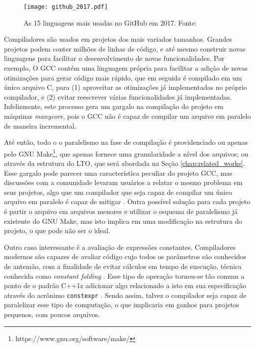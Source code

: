 \begin{figure}[ht]
 \centering
 \texttt{[image: github\_2017.pdf]}
 \caption{As 15 linguagens mais usadas no GitHub em 2017. Fonte: \cite{githuboctoverse}}
 \label{fig:github_2017}
\end{figure}

Compiladores são usados em projetos dos mais variados tamanhos.
Grandes projetos podem conter milhões de linhas de código, e até mesmo
construir novas linguagens para facilitar o desenvolvimento de novas
funcionalidades. Por exemplo, O GCC contém uma linguagem própria para facilitar
a adição de novas otimizações para gerar código mais rápido, que em seguida é
compilado em um único arquivo C, para (1) aproveitar as otimizações já
implementadas no próprio compilador, e (2) evitar reescrever várias
funcionalidades já implementadas. Infelizmente, este processo
gera um gargalo na compilação do projeto em máquinas \textit{manycore}, pois o
GCC não é capaz de compilar um arquivo em paralelo de maneira incremental.

Até então, todo o o
paralelismo na fase de compilação é providenciado ou apenas pelo
GNU Make\footnote{https://www.gnu.org/software/make/}, que apenas
fornece uma granularidade a nível dos arquivos; ou através da estrutura do LTO,
que será abordada na Seção \ref{chap:related_works}. Esse gargalo pode parecer uma
característica peculiar do projeto GCC, mas discussões com a comunidade levaram
usuários a relatar o mesmo problema em seus projetos, algo que um compilador
que seja capaz de compilar um único arquivo em paralelo é capaz de mitigar
\citep{mailgcc} \citep{phoronix}. Outra possível solução para cada
projeto é partir o arquivo em arquivos menores e utilizar o esquema de
paralelismo já existente do GNU Make, mas isto implica em uma modificação na
estrutura do projeto, o que pode não ser o ideal.

Outro caso interessante é a avaliação de expressões constantes. Compiladores
modernos são capazes de avaliar código cujo todos os parâmetros são conhecidos
de antemão, com a finalidade de evitar cálculos em tempo de execução, técnica
conhecida como \textit{constant folding} \citep{dragonbook}. Esse tipo de
operação tornou-se tão comum a ponto de o padrão C++1z adicionar algo
relacionado a isto em sua especificação através do acrônimo \texttt{constexpr}
\citep{iso148822017}.
Sendo assim, talvez o compilador seja capaz de paralelizar esse tipo de
computação, o que implicaria em ganhos para projetos pequenos, com poucos
arquivos.


